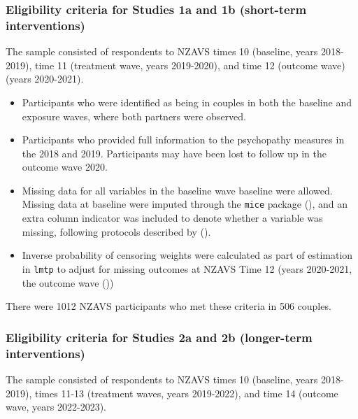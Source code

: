 \documentclass[
  single column]{article}
\providecommand{\tightlist}{%
  \setlength{\itemsep}{0pt}\setlength{\parskip}{0pt}}\usepackage{longtable,booktabs,array}
\begin{document}
\subsubsection{Eligibility criteria for Studies 1a and 1b (short-term
interventions)}\label{eligibility-criteria-for-studies-1a-and-1b-short-term-interventions}

The sample consisted of respondents to NZAVS times 10 (baseline, years
2018-2019), time 11 (treatment wave, years 2019-2020), and time 12
(outcome wave) (years 2020-2021).

\begin{itemize}
\tightlist
\item
  Participants who were identified as being in couples in both the
  baseline and exposure waves, where both partners were observed.\\
\item
  Participants who provided full information to the psychopathy measures
  in the 2018 and 2019. Participants may have been lost to follow up in
  the outcome wave 2020.
\item
  Missing data for all variables in the baseline wave baseline were
  allowed. Missing data at baseline were imputed through the
  \texttt{mice} package (),
  and an extra column indicator was included to denote whether a
  variable was missing, following protocols described by
  ().
\item
  Inverse probability of censoring weights were calculated as part of
  estimation in \texttt{lmtp} to adjust for missing outcomes at NZAVS
  Time 12 (years 2020-2021, the outcome wave
  ())
\end{itemize}

There were 1012 NZAVS participants who met these criteria in 506
couples.

\subsubsection{Eligibility criteria for Studies 2a and 2b (longer-term
interventions)}\label{eligibility-criteria-for-studies-2a-and-2b-longer-term-interventions}

The sample consisted of respondents to NZAVS times 10 (baseline, years
2018-2019), times 11-13 (treatment waves, years 2019-2022), and time 14
(outcome wave, years 2022-2023).
\end{document}

